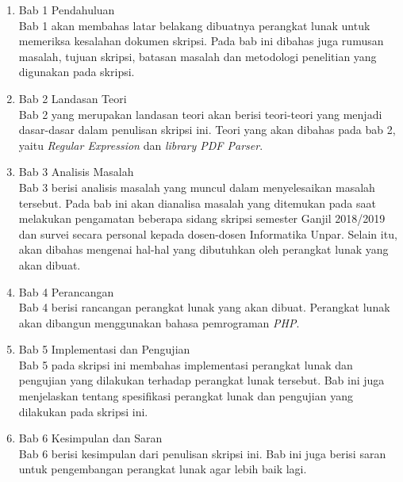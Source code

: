 \begin{enumerate}
	\item Bab 1 Pendahuluan
	\\
	Bab 1 akan membahas latar belakang dibuatnya perangkat lunak untuk memeriksa kesalahan dokumen skripsi. Pada bab ini dibahas juga rumusan masalah, tujuan skripsi, batasan masalah dan metodologi penelitian yang digunakan pada skripsi.

	\item Bab 2 Landasan Teori
	\\
	Bab 2 yang merupakan landasan teori akan berisi teori-teori yang menjadi dasar-dasar dalam penulisan skripsi ini. Teori yang akan dibahas pada bab 2, yaitu \textit{Regular Expression} dan \textit{library PDF Parser}.
	
	\item Bab 3 Analisis Masalah
	\\
	Bab 3 berisi analisis masalah yang muncul dalam menyelesaikan masalah tersebut. Pada bab ini akan dianalisa masalah yang ditemukan pada saat melakukan pengamatan beberapa sidang skripsi semester Ganjil 2018/2019 dan survei secara personal kepada dosen-dosen Informatika Unpar. Selain itu, akan dibahas mengenai hal-hal yang dibutuhkan oleh perangkat lunak yang akan dibuat.
	
	\item Bab 4 Perancangan
	\\
	Bab 4 berisi rancangan perangkat lunak yang akan dibuat. Perangkat lunak akan dibangun menggunakan bahasa pemrograman \textit{PHP}.
	
	\item Bab 5 Implementasi dan Pengujian
	\\
	Bab 5 pada skripsi ini membahas implementasi perangkat lunak dan pengujian yang dilakukan
terhadap perangkat lunak tersebut. Bab ini juga menjelaskan tentang spesifikasi perangkat lunak dan pengujian yang dilakukan pada skripsi ini.
	
	\item Bab 6 Kesimpulan dan Saran
	\\
	Bab 6 berisi kesimpulan dari penulisan skripsi ini. Bab ini juga berisi saran untuk pengembangan perangkat lunak agar lebih baik lagi.
\end{enumerate}